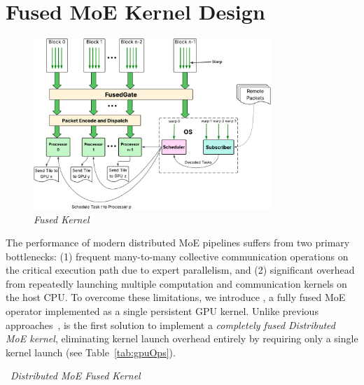 \section{Fused MoE Kernel Design}\label{sec:method}
\begin{figure}[!ht]
    \centering
    \includegraphics[width=0.8\textwidth, keepaspectratio]{figures/architecture}
    \caption{\emph{\sysname Fused Kernel}}
    \label{fig:fusedK}
\end{figure}
The performance of modern distributed MoE pipelines suffers from two primary bottlenecks: (1) frequent many-to-many
collective communication operations on the critical execution path due to expert parallelism, and (2) significant overhead from repeatedly launching multiple computation and communication kernels on the host CPU. To overcome these limitations, we introduce \sysname, a fully fused MoE operator implemented as a single persistent GPU kernel. Unlike previous approaches~\cite{comet, deepep, pmlr-v162-rajbhandari22a, megatron, MLSYS2023_5616d34c, MLSYS2024_339caf45, 10.1145/3503221.3508418, 10.1145/3588964, 10.1145/3627703.3650083, 10.1145/3710848.3710868, NEURIPS2022_67d57c32}, \sysname is the first solution to implement a \emph{completely fused Distributed MoE kernel}, eliminating kernel launch overhead entirely by requiring only a single kernel launch (see Table~\ref{tab:gpuOps}).
\begin{algorithm}[!h]
    \small
    \DontPrintSemicolon
    \caption{~\emph{\sysname Distributed MoE Fused Kernel}}\label{alg:one}
\end{algorithm}
